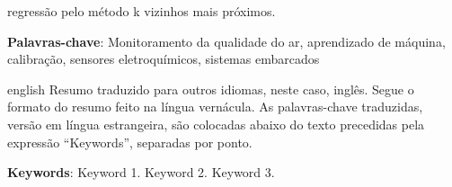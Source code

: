 \begin{resumo}
regressão pelo método k vizinhos mais próximos.
	
	\textbf{Palavras-chave}: Monitoramento da qualidade do ar, aprendizado de máquina, calibração, sensores eletroquímicos, sistemas embarcados
\end{resumo}

\begin{resumo}[Abstract]
	\SingleSpacing
	\begin{otherlanguage*}{english}
		Resumo traduzido para outros idiomas, neste caso, inglês. Segue o formato do resumo feito na língua vernácula. As palavras-chave traduzidas, versão em língua estrangeira, são colocadas abaixo do texto precedidas pela expressão “Keywords”, separadas por ponto.
		
		\textbf{Keywords}: Keyword 1. Keyword 2. Keyword 3.
	\end{otherlanguage*}
\end{resumo}

% 
%
%  

{%
	\hypersetup{hidelinks}
	\listoffigures*
	\cleardoublepage
	
	\listofquadros*
	\cleardoublepage
	
	\listoftables*
	\cleardoublepage
	
	
	\printglossary[title=Lista de Siglas, toctitle=Lista de siglas]
    \printglossary[type=\acronymtype,title=Lista de Símbolos, toctitle=Lista de símbolos]

	\tableofcontents*
	\cleardoublepage
	
}%
